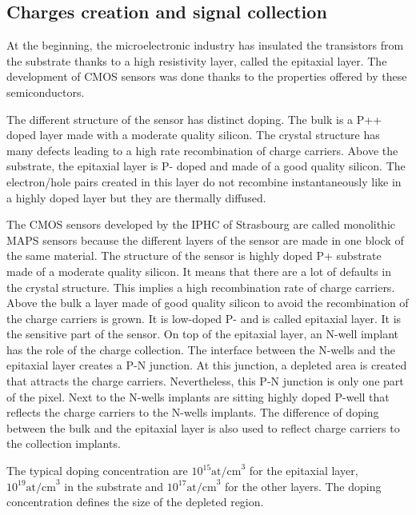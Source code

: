     \subsection{Charges creation and signal collection}   

    At the beginning, the microelectronic industry has insulated the transistors from the substrate thanks to a high resistivity layer, called the epitaxial layer.
    The development of \gls{CMOS} sensors was done thanks to the properties offered by these semiconductors.

    The different structure of the sensor has distinct doping.
    The bulk is a P++ doped layer made with a moderate quality silicon.
    The crystal structure has many defects leading to a high rate recombination of charge carriers.
    Above the substrate, the epitaxial layer is P- doped and made of a good quality silicon.
    The electron/hole pairs created in this layer do not recombine instantaneously like in a highly doped layer but they are thermally diffused. 
    
    The \gls{CMOS} sensors developed by the IPHC of Strasbourg are called monolithic \gls{MAPS} sensors because the different layers of the sensor are made in one block of the same material.
    The structure of the sensor is highly doped P+ substrate made of a moderate quality silicon. 
    It means that there are a lot of defaults in the crystal structure.
    This implies a high recombination rate of charge carriers.
    Above the bulk a layer made of good quality silicon to avoid the recombination of the charge carriers is grown.
    It is low-doped P- and is called epitaxial layer. 
    It is the sensitive part of the sensor. 
    On top of the epitaxial layer, an N-well implant has the role of the charge collection.
    The interface between the N-wells and the epitaxial layer creates a P-N junction.
    At this junction, a depleted area is created that attracts the charge carriers.
    Nevertheless, this P-N junction is only one part of the pixel.
    Next to the N-wells implants are sitting highly doped P-well that reflects the charge carriers to the N-wells implants. 
    The difference of doping between the bulk and the epitaxial layer is also used to reflect charge carriers to the collection implants.

    The typical doping concentration are $10^{15} \text{at/cm}^3$ for the epitaxial layer, $10^{19} \text{at/cm}^3$ in the substrate and $10^{17} \text{at/cm}^3$ for the other layers.
    The doping concentration defines the size of the depleted region.


